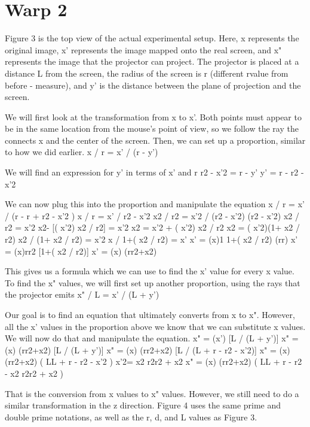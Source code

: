 \documentclass[a4paper]{article}
\begin{document}
\section{Warp 2}

	Figure 3 is the top view of the actual experimental setup. Here, x represents the original image, x' represents the image mapped onto the real screen, and x" represents the image that the projector can project. The projector is placed at a distance L from the screen, the radius of the screen is r (different rvalue from before - measure), and y' is the distance between the plane of projection and the screen.




We will first look at the transformation from x to x'. Both points must appear to be in the same location from the mouse’s point of view, so we follow the ray the connects x and the center of the screen. Then, we can set up a proportion, similar to how we did earlier. 
x / r =  x' / (r - y')

We will find an expression for y' in terms of x' and r
  r2 - x'2 = r - y'
y' = r -  r2 - x'2	

We can now plug this into the proportion and manipulate the equation
x / r = x' / (r - r +  r2 - x'2 )
x / r = x' /   r2 - x'2 
x2 / r2 =  x'2 /  (r2 - x'2) 	
(r2 - x'2) x2 / r2 =  x'2 
x2- [( x'2) x2 / r2] =  x'2 
x2 =  x'2 + ( x'2) x2 / r2
x2 =  ( x'2)(1+ x2 / r2)	
x2 / (1+ x2 / r2) =   x'2
x / 1+( x2 / r2) =   x'
x' = (x)1 1+( x2 / r2) (rr)
x' = (x)rr2 [1+( x2 / r2)] 
x' = (x) (rr2+x2)

This gives us a formula which we can use to find the x' value for every x value.
To find the x" values, we will first set up another proportion, using the rays that the projector emits
x" / L = x' / (L + y')

Our goal is to find an equation that ultimately converts from x to x". However, all the x' values in the proportion above we know that we can substitute x values. We will now do that and manipulate the equation. 
x" = (x') [L / (L + y')]
x" =  (x) (rr2+x2) [L / (L + y')]
x" =  (x) (rr2+x2) [L / (L + r -  r2 - x'2)]
x" =  (x) (rr2+x2) ( LL + r -   r2 - x'2 )
x'2= x2 r2r2 + x2
x" =  (x) (rr2+x2) ( LL + r -   r2 - x2 r2r2 + x2 )

That is the conversion from x values to x" values. However, we still need to do a similar transformation in the z direction. 
	Figure 4 uses the same prime and double prime notations, as well as the r, d, and L values as Figure 3. 
\end{document}
